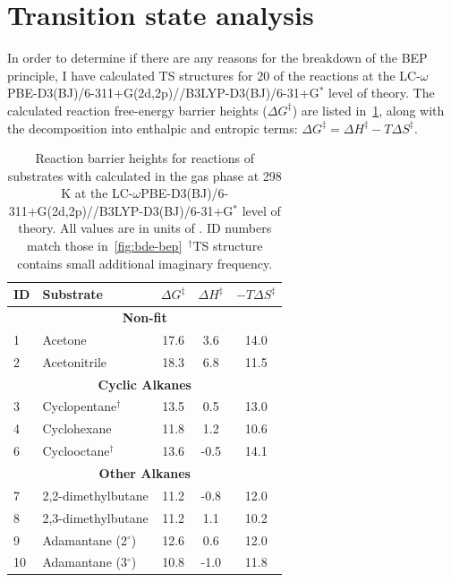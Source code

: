 \newpage
\section{Transition state analysis}

In order to determine if there are any reasons for the breakdown of the BEP principle, I have calculated TS structures for 20 of the reactions at the LC-$\omega$PBE-D3(BJ)/6-311+G(2d,2p)//B3LYP-D3(BJ)/6-31+G$^*$ level of theory. The calculated reaction free-energy barrier heights ($\Delta G^\ddagger$) are listed in~\ref{tab:ts-bep}, along with the decomposition into enthalpic and entropic terms: $\Delta G^\ddagger = \Delta H^\ddagger - T\Delta S^\ddagger$.

\begin{table}[!htbp]
  \caption[Reaction barrier heights for reactions of substrates with \cumo calculated in the gas phase at 298 K.]{Reaction barrier heights for reactions of substrates with \cumo calculated in the gas phase at 298 K at the LC-$\omega$PBE-D3(BJ)/6-311+G(2d,2p)//B3LYP-D3(BJ)/6-31+G$^*$ level of theory. All values are in units of \kcalmol. ID numbers match those in~\protect\ref{fig:bde-bep}\ $^\dagger$TS structure contains small additional imaginary frequency.}
  \label{tab:ts-bep}
  \begin{tabular}{l l c c c}
    ID & Substrate & $\Delta G^\ddagger$ & $\Delta H^\ddagger$ & $-T\Delta S^\ddagger$ \\
    \hline
    \multicolumn{5}{c}{\textbf{Non-fit}}\\
    1 & Acetone & 17.6 & 3.6 & 14.0 \\
    2 & Acetonitrile & 18.3 & 6.8 & 11.5 \\
    \hline
    \multicolumn{5}{c}{\textbf{ Cyclic Alkanes}}\\
    3 & Cyclopentane$^\dagger$ & 13.5 & 0.5 & 13.0 \\
    4 & Cyclohexane & 11.8 & 1.2 & 10.6 \\
    6 & Cyclooctane$^\dagger$ & 13.6 & -0.5 & 14.1 \\
    \hline
    \multicolumn{5}{c}{\textbf{Other Alkanes}}\\
    7 & 2,2-dimethylbutane & 11.2 & -0.8 & 12.0 \\
    8 & 2,3-dimethylbutane & 11.2 & 1.1 & 10.2 \\
    9 & Adamantane (2$^\circ$) & 12.6 & 0.6 & 12.0 \\
    10 & Adamantane (3$^\circ$) & 10.8 & -1.0 & 11.8 \\
    \hline

\end{tabular}
\end{table}
